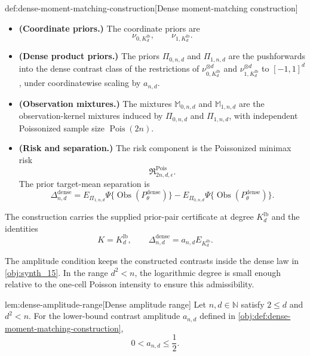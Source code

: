 \documentclass[11pt]{article}
\begin{document}
\begin{definitionv}{def:dense-moment-matching-construction}[Dense moment-matching construction]
\begin{itemize}
\[
\lambda_{n,d}=\frac{2n}{d},
\qquad
a_{n,d}=\sqrt{\frac{K_d^{\mathrm{lb}}}{64\lambda_{n,d}}}.
\]
\item \textbf{(Coordinate priors.)} The coordinate priors are
\[
\nu_{0,K_d^{\mathrm{lb}}},
\qquad
\nu_{1,K_d^{\mathrm{lb}}}.
\]
\item \textbf{(Dense product priors.)} The priors \(\Pi_{0,n,d}\) and \(\Pi_{1,n,d}\) are the pushforwards into the dense contrast class of the restrictions of \(\nu_{0,K_d^{\mathrm{lb}}}^{\otimes d}\) and \(\nu_{1,K_d^{\mathrm{lb}}}^{\otimes d}\) to \([-1,1]^d\), under coordinatewise scaling by \(a_{n,d}\).
\item \textbf{(Observation mixtures.)} The mixtures \(\mathbb M_{0,n,d}\) and \(\mathbb M_{1,n,d}\) are the observation-kernel mixtures induced by \(\Pi_{0,n,d}\) and \(\Pi_{1,n,d}\), with independent Poissonized sample size \(\operatorname{Pois}(2n)\).
\item \textbf{(Risk and separation.)} The risk component is the Poissonized minimax risk
\[
\mathfrak R^{\mathrm{Pois}}_{2n,d,\epsilon}.
\]
The prior target-mean separation is
\[
\Delta_{n,d}^{\mathrm{dense}}
=
E_{\Pi_{1,n,d}}\Psi\{\operatorname{Obs}(P_\theta^{\mathrm{dense}})\}
-
E_{\Pi_{0,n,d}}\Psi\{\operatorname{Obs}(P_\theta^{\mathrm{dense}})\}.
\]
\end{itemize}
The construction carries the supplied prior-pair certificate at degree \(K_d^{\mathrm{lb}}\) and the identities
\[
K=K_d^{\mathrm{lb}},
\qquad
\Delta_{n,d}^{\mathrm{dense}}
=
a_{n,d}E_{K_d^{\mathrm{lb}}}.
\]
\end{definitionv}

The amplitude condition keeps the constructed contrasts inside the dense law in \cref{obj:synth_15}. In the range \(d^2<n\), the logarithmic degree is small enough relative to the one-cell Poisson intensity to ensure this admissibility.

\begin{lemmav}{lem:dense-amplitude-range}[Dense amplitude range]
Let \(n,d\in\mathbb N\) satisfy \(2\le d\) and \(d^2<n\). For the lower-bound contrast amplitude \(a_{n,d}\) defined in \cref{obj:def:dense-moment-matching-construction},
\[
0<a_{n,d}\le \frac12.
\]
\end{lemmav}
\end{document}
